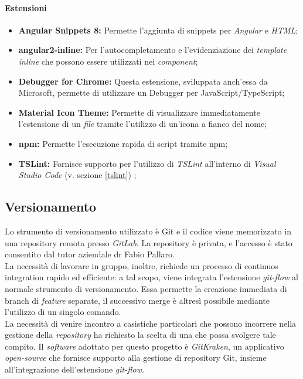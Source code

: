 \paragraph{Estensioni}
\begin{itemize}
	\item \textbf{Angular Snippets 8:} Permette l'aggiunta di \gls{snippets} per \textit{Angular} e \textit{HTML};
	\item \textbf{angular2-inline:} Per l'autocompletamento e l'evidenziazione dei \textit{template inline} che possono essere utilizzati nei \textit{component};
	\item \textbf{Debugger for Chrome:} Questa estensione, sviluppata anch'essa da Microsoft, permette di utilizzare un \gls{Debugger} per JavaScript/TypeScript;
	\item \textbf{Material Icon Theme:} Permette di visualizzare immediatamente l'estensione di un \textit{file} tramite l'utilizzo di un'icona a fianco del nome;
	\item \textbf{npm:} Permette l'esecuzione rapida di script tramite \gls{npm};
	\item \textbf{TSLint:} Fornisce supporto per l'utilizzo di \textit{TSLint} all'interno di \textit{Visual Studio Code} (v. sezione \ref{tslint}) ;
\end{itemize}

\subsection{Versionamento}
Lo strumento di versionamento utilizzato è \gls{Git} e il codice viene memorizzato in una \gls{repository} remota presso \textit{GitLab}. La repository è privata, e l'accesso è stato consentito dal tutor aziendale dr Fabio Pallaro.\\
La necessità di lavorare in gruppo, inoltre, richiede un processo di \gls{continuos integration} rapido ed efficiente: a tal scopo, viene integrata l'estensione \textit{git-flow}  al normale strumento di versionamento. Essa permette la creazione immediata di \gls{branch} di \textit{feature} separate, il successivo \gls{merge} è altresì possibile mediante l'utilizzo di un singolo comando.\\
La necessità di venire incontro a casistiche particolari che possono incorrere nella gestione della \textit{repository} ha richiesto la scelta di una  che possa svolgere tale compito. Il \textit{software} adottato per questo progetto è \textit{GitKraken}, un applicativo \textit{open-source} che fornisce  supporto alla gestione di repository \gls{Git}, insieme all'integrazione dell'estensione \textit{git-flow}.

